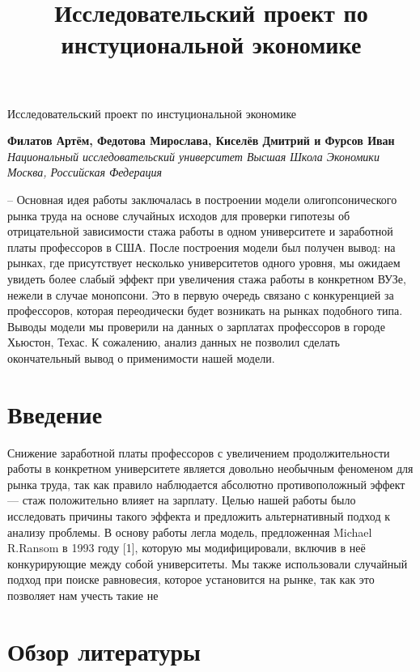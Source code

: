 \documentclass[a4paper, 12pt]{article}
\title{Исследовательский проект по инстуциональной экономике}
\theoremstyle{definition}
\theoremstyle{plain}
\begin{document}
\begin{center}
{\Large\sc Исследовательский проект по инстуциональной экономике}\vspace{0.2cm}\\
\end{center}
\begin{center}
{\bf Филатов Артём, Федотова Мирослава, Киселёв Дмитрий и Фурсов Иван}\vspace{0.1cm}\\
{\it Национальный исследовательский университет Высшая Школа Экономики\\ 
Москва, Российская Федерация}\vspace{0.1cm}\\
\end{center}


-- Основная идея работы заключалась в построении модели олигопсонического рынка труда на основе случайных исходов для проверки гипотезы об отрицательной зависимости стажа работы в одном университете и заработной платы профессоров в США. После построения модели был получен вывод: на рынках, где присутствует несколько университетов одного уровня, мы ожидаем увидеть более слабый эффект при увеличения стажа работы в конкретном ВУЗе, нежели в случае монопсони. Это в первую очередь связано с конкуренцией за профессоров, которая переодически будет возникать на рынках подобного типа. Выводы модели мы проверили на данных о зарплатах профессоров в городе Хьюстон, Техас. К сожалению, анализ данных не позволил сделать окончательный вывод о применимости нашей модели. 

\section{Введение}

Снижение заработной платы профессоров с увеличением продолжительности работы в конкретном университете является довольно необычным феноменом для рынка труда, так как правило наблюдается абсолютно противоположный эффект --- стаж положительно влияет на зарплату.  Целью нашей работы было исследовать причины такого эффекта и предложить альтернативный подход к анализу проблемы. В основу работы легла модель, предложенная Michael R.Ransom в 1993 году [1], которую мы модифицировали, включив в неё конкурирующие между собой университеты. Мы также использовали случайный подход при поиске равновесия, которое установится на рынке, так как это позволяет нам учесть такие не

\section{Обзор литературы}
\end{document}
